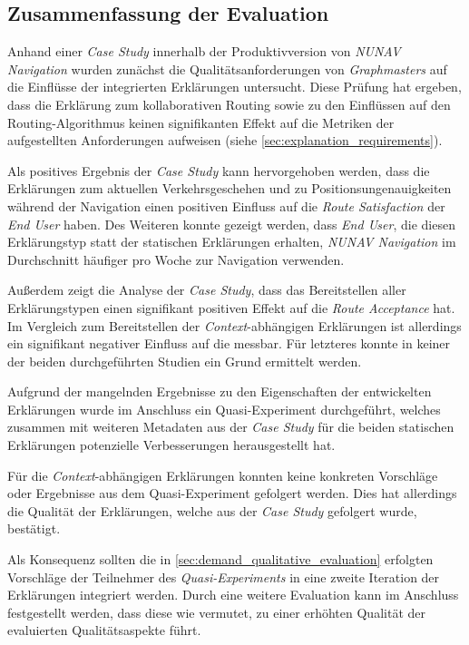 \subsection{Zusammenfassung der Evaluation}

Anhand einer \textit{Case Study} innerhalb der Produktivversion von \textit{NUNAV Navigation} wurden zunächst die Qualitätsanforderungen von \textit{Graphmasters} auf die Einflüsse der integrierten Erklärungen untersucht. Diese Prüfung hat ergeben, dass die Erklärung zum kollaborativen Routing sowie zu den Einflüssen auf den Routing-Algorithmus keinen signifikanten Effekt auf die Metriken der aufgestellten Anforderungen aufweisen (siehe \autoref{sec:explanation_requirements}).

Als positives Ergebnis der \textit{Case Study} kann hervorgehoben werden, dass die Erklärungen zum aktuellen Verkehrsgeschehen und zu Positionsungenauigkeiten während der Navigation einen positiven Einfluss auf die \textit{Route Satisfaction} der \textit{End User} haben. Des Weiteren konnte gezeigt werden, dass \textit{End User}, die diesen Erklärungstyp statt der statischen Erklärungen erhalten, \textit{NUNAV Navigation} im Durchschnitt häufiger pro Woche zur Navigation verwenden.

Außerdem zeigt die Analyse der \textit{Case Study}, dass das Bereitstellen aller Erklärungstypen einen signifikant positiven Effekt auf die \textit{Route Acceptance} hat. Im Vergleich zum Bereitstellen der \textit{Context}-abhängigen Erklärungen ist allerdings ein signifikant negativer Einfluss auf die  messbar. Für letzteres konnte in keiner der beiden durchgeführten Studien ein Grund ermittelt werden.

Aufgrund der mangelnden Ergebnisse zu den Eigenschaften der entwickelten Erklärungen wurde im Anschluss ein Quasi-Experiment durchgeführt, welches zusammen mit weiteren Metadaten aus der \textit{Case Study} für die beiden statischen Erklärungen potenzielle Verbesserungen herausgestellt hat.

Für die \textit{Context}-abhängigen Erklärungen konnten keine konkreten Vorschläge oder Ergebnisse aus dem Quasi-Experiment gefolgert werden. Dies hat allerdings die Qualität der Erklärungen, welche aus der \textit{Case Study} gefolgert wurde, bestätigt.

Als Konsequenz sollten die in \autoref{sec:demand_qualitative_evaluation} erfolgten Vorschläge der Teilnehmer des \textit{Quasi-Experiments} in eine zweite Iteration der Erklärungen integriert werden. Durch eine weitere Evaluation kann im Anschluss festgestellt werden, dass diese wie vermutet, zu einer erhöhten Qualität der evaluierten Qualitätsaspekte führt.

